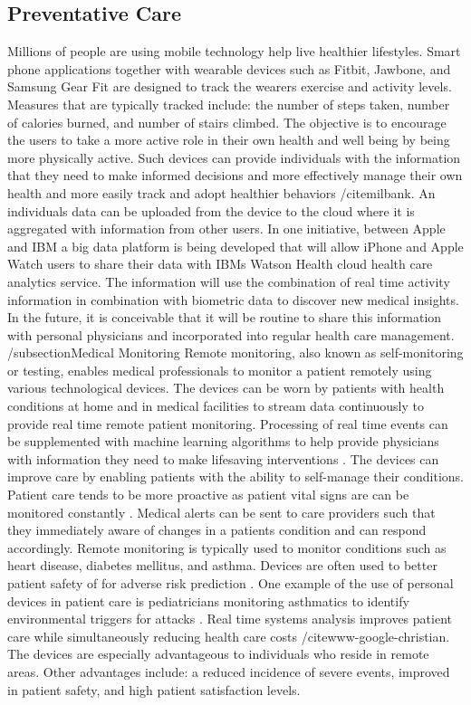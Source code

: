 \documentclass[sigconf]{acmart}
\begin{document}
\subsection{Preventative Care}
Millions of people are using mobile technology help live healthier lifestyles. Smart phone applications together with wearable devices such as Fitbit, Jawbone, and Samsung Gear Fit are designed to track the wearers exercise and activity levels. Measures that are typically tracked include: the number of steps taken, number of calories burned, and number of stairs climbed. The objective is to encourage the users to take a more active role in their own health and well being by being more physically active. Such devices can provide individuals with the information that they need to make informed decisions and more effectively manage their own health and more easily track and adopt healthier behaviors /cite{milbank}. 
An individuals data can be uploaded from the device to the cloud where it is aggregated with information from other users.  In one initiative, between Apple and IBM a big data platform is being developed that will allow iPhone and Apple Watch users to share their data with IBMs Watson Health cloud health care analytics service. The information will use the combination of real time activity information in combination with biometric data to discover new medical insights.  In the future, it is conceivable that it will be routine to share this information with personal physicians and incorporated into regular health care management. 
/subsection{Medical Monitoring} 
Remote monitoring, also known as self-monitoring or testing, enables medical professionals to monitor a patient remotely using various technological devices. The devices can be worn by patients with health conditions at home and in medical facilities to stream data continuously to provide real time remote patient monitoring.  Processing of real time events can be supplemented with machine learning algorithms to help provide physicians with information they need to make lifesaving interventions \cite{www-google-McDonald}.  The devices can improve care by enabling patients with the ability to self-manage their conditions. Patient care tends to be more proactive as patient vital signs are can be monitored constantly \cite{McDonald}. Medical alerts can be sent to care providers such that they immediately aware of changes in a patients condition and can respond accordingly.  Remote monitoring is typically used to monitor conditions such as heart disease, diabetes mellitus, and asthma. Devices are often used to better patient safety of for adverse risk prediction \cite{McDonald}.  One example of the use of personal devices in patient care is pediatricians monitoring asthmatics to identify environmental triggers for attacks \cite{www-google-CIO}. 
Real time systems analysis improves patient care while simultaneously reducing health care costs /cite{www-google-christian}.  The devices are especially advantageous to individuals who reside in remote areas. Other advantages include: a reduced incidence of severe events, improved in patient safety, and high patient satisfaction levels. 
\end{document}
